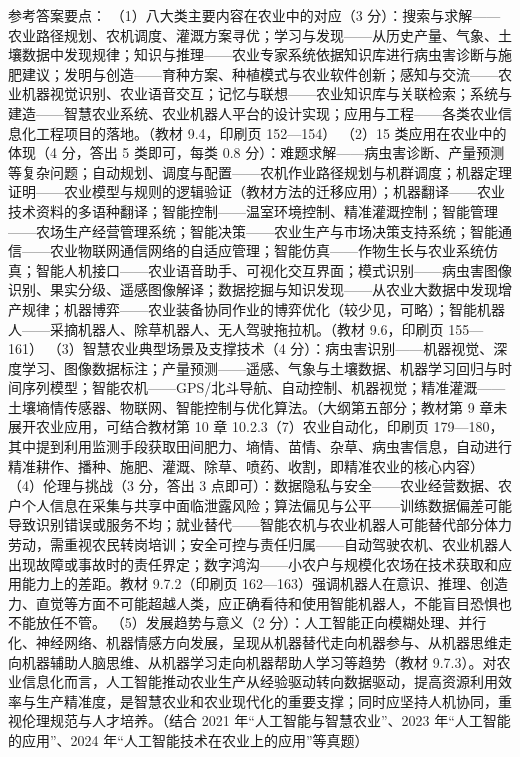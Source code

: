 \documentclass[a4paper,11pt]{article}
\begin{document}

\q 参考答案要点：
（1）八大类主要内容在农业中的对应（3 分）：搜索与求解——农业路径规划、农机调度、灌溉方案寻优；学习与发现——从历史产量、气象、土壤数据中发现规律；知识与推理——农业专家系统依据知识库进行病虫害诊断与施肥建议；发明与创造——育种方案、种植模式与农业软件创新；感知与交流——农业机器视觉识别、农业语音交互；记忆与联想——农业知识库与关联检索；系统与建造——智慧农业系统、农业机器人平台的设计实现；应用与工程——各类农业信息化工程项目的落地。（教材 9.4，印刷页 152—154）
（2）15 类应用在农业中的体现（4 分，答出 5 类即可，每类 0.8 分）：难题求解——病虫害诊断、产量预测等复杂问题；自动规划、调度与配置——农机作业路径规划与机群调度；机器定理证明——农业模型与规则的逻辑验证（教材方法的迁移应用）；机器翻译——农业技术资料的多语种翻译；智能控制——温室环境控制、精准灌溉控制；智能管理——农场生产经营管理系统；智能决策——农业生产与市场决策支持系统；智能通信——农业物联网通信网络的自适应管理；智能仿真——作物生长与农业系统仿真；智能人机接口——农业语音助手、可视化交互界面；模式识别——病虫害图像识别、果实分级、遥感图像解译；数据挖掘与知识发现——从农业大数据中发现增产规律；机器博弈——农业装备协同作业的博弈优化（较少见，可略）；智能机器人——采摘机器人、除草机器人、无人驾驶拖拉机。（教材 9.6，印刷页 155—161）
（3）智慧农业典型场景及支撑技术（4 分）：病虫害识别——机器视觉、深度学习、图像数据标注；产量预测——遥感、气象与土壤数据、机器学习回归与时间序列模型；智能农机——GPS/北斗导航、自动控制、机器视觉；精准灌溉——土壤墒情传感器、物联网、智能控制与优化算法。（大纲第五部分；教材第 9 章未展开农业应用，可结合教材第 10 章 10.2.3（7）农业自动化，印刷页 179—180，其中提到利用监测手段获取田间肥力、墒情、苗情、杂草、病虫害信息，自动进行精准耕作、播种、施肥、灌溉、除草、喷药、收割，即精准农业的核心内容）
（4）伦理与挑战（3 分，答出 3 点即可）：数据隐私与安全——农业经营数据、农户个人信息在采集与共享中面临泄露风险；算法偏见与公平——训练数据偏差可能导致识别错误或服务不均；就业替代——智能农机与农业机器人可能替代部分体力劳动，需重视农民转岗培训；安全可控与责任归属——自动驾驶农机、农业机器人出现故障或事故时的责任界定；数字鸿沟——小农户与规模化农场在技术获取和应用能力上的差距。教材 9.7.2（印刷页 162—163）强调机器人在意识、推理、创造力、直觉等方面不可能超越人类，应正确看待和使用智能机器人，不能盲目恐惧也不能放任不管。
（5）发展趋势与意义（2 分）：人工智能正向模糊处理、并行化、神经网络、机器情感方向发展，呈现从机器替代走向机器参与、从机器思维走向机器辅助人脑思维、从机器学习走向机器帮助人学习等趋势（教材 9.7.3）。对农业信息化而言，人工智能推动农业生产从经验驱动转向数据驱动，提高资源利用效率与生产精准度，是智慧农业和农业现代化的重要支撑；同时应坚持人机协同，重视伦理规范与人才培养。（结合 2021 年“人工智能与智慧农业”、2023 年“人工智能的应用”、2024 年“人工智能技术在农业上的应用”等真题）
\end{document}
